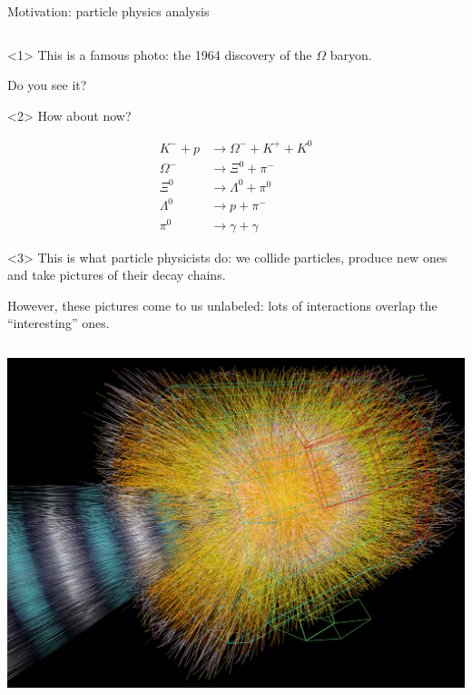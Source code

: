 \documentclass[aspectratio=169]{beamer}
\begin{document}
\begin{frame}{Motivation: particle physics analysis}
\begin{columns}
\begin{center}
\begin{onlyenv}<1>
This is a famous photo: the 1964 discovery of the $\Omega$ baryon.

\vspace{1 cm}
Do you see it?

\vspace{1 cm}
\end{onlyenv}\begin{onlyenv}<2>
How about now?

\begin{align*}
K^- + p & \to \Omega^- + K^+ + K^0 \\
\Omega^- & \to \Xi^0 + \pi^- \\
\Xi^0 & \to \Lambda^0 + \pi^0 \\
\Lambda^0 & \to p + \pi^- \\
\pi^0 & \to \gamma + \gamma
\end{align*}

\vspace{1 cm}
\end{onlyenv}\begin{onlyenv}<3>
This is what particle physicists do: we collide particles, produce new ones and take pictures of their decay chains.

\vspace{1 cm}
However, these pictures come to us unlabeled: lots of interactions overlap the ``interesting'' ones.

\vspace{1 cm}
\end{onlyenv}
\end{center}

\end{columns}
\end{frame}

\begin{frame}{}
\begin{columns}
\includegraphics[width=\linewidth]{090324_ALICE-hirez.jpg}
\end{columns}
\end{frame}
\end{document}
